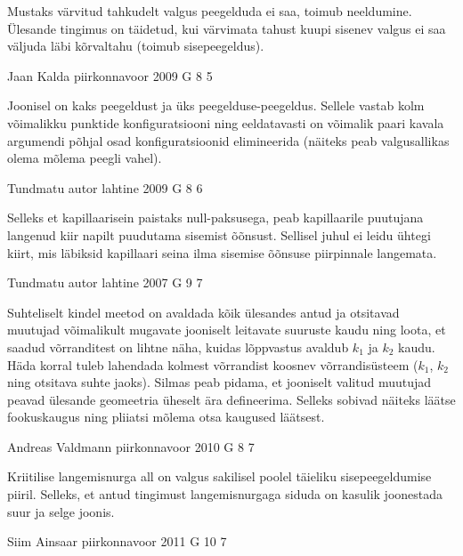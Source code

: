 \documentclass[11pt, twoside]{article}
\begin{document}
{{\ifHint
Mustaks värvitud tahkudelt valgus peegelduda ei saa, toimub neeldumine. Ülesande tingimus on täidetud, kui värvimata tahust kuupi sisenev valgus ei saa
väljuda läbi kõrvaltahu (toimub sisepeegeldus).
\fi
}

{Jaan Kalda} %
{piirkonnavoor} %
{2009} %
{G 8} %
{5} %
{

\ifHint
Joonisel on kaks peegeldust ja üks peegelduse-peegeldus. Sellele vastab kolm võimalikku punktide konfiguratsiooni ning eeldatavasti on võimalik paari kavala argumendi põhjal osad konfiguratsioonid elimineerida (näiteks peab valgusallikas olema mõlema peegli vahel).
\fi
}

{Tundmatu autor} %
{lahtine} %
{2009} %
{G 8} %
{6} %
{

\ifHint
Selleks et kapillaarisein paistaks null-paksusega, peab kapillaarile puutujana langenud kiir napilt puudutama sisemist õõnsust. Sellisel juhul ei leidu ühtegi kiirt, mis läbiksid kapillaari seina ilma sisemise õõnsuse piirpinnale langemata.
\fi
}

{Tundmatu autor} %
{lahtine} %
{2007} %
{G 9} %
{7} %
{

\ifHint
Suhteliselt kindel meetod on avaldada kõik ülesandes antud ja otsitavad muutujad võimalikult mugavate jooniselt leitavate suuruste kaudu ning loota, et saadud võrranditest on lihtne näha, kuidas lõppvastus avaldub $k_1$ ja $k_2$ kaudu. Häda korral tuleb lahendada kolmest võrrandist koosnev võrrandisüsteem ($k_1$, $k_2$ ning otsitava suhte jaoks). Silmas peab pidama, et jooniselt valitud muutujad peavad ülesande geomeetria üheselt ära defineerima. Selleks sobivad näiteks läätse fookuskaugus ning pliiatsi mõlema otsa kaugused läätsest.
\fi
}

{Andreas Valdmann} %
{piirkonnavoor} %
{2010} %
{G 8} %
{7} %
{

\ifHint
Kriitilise langemisnurga all on valgus sakilisel poolel täieliku sisepeegeldumise piiril. Selleks, et antud tingimust langemisnurgaga siduda on kasulik joonestada suur ja selge joonis.
\fi
}

{Siim Ainsaar} %
{piirkonnavoor} %
{2011} %
{G 10} %
{7} %
{

}}
\end{document}
